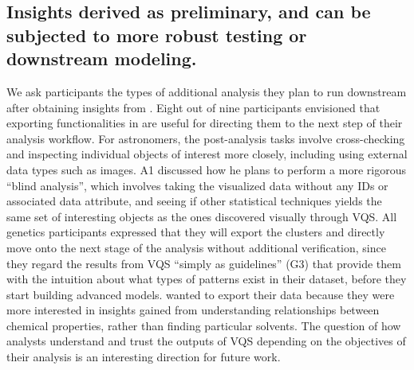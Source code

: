 \subsection{Insights derived as preliminary, and can be subjected to more robust testing or downstream modeling.}
\par We ask participants the types of additional analysis they plan to run downstream after obtaining insights from \zv. Eight out of nine participants envisioned that exporting functionalities in \zv are useful for directing them to the next step of their analysis workflow. For astronomers, the post-analysis tasks involve cross-checking and inspecting individual objects of interest more closely, including using external data types such as images. A1 discussed how he plans to perform a more rigorous ``blind analysis'', which involves taking the visualized data without any IDs or associated data attribute, and seeing if other statistical techniques yields the same set of interesting objects as the ones discovered visually through VQS. All genetics participants expressed that they will export the clusters and directly move onto the next stage of the analysis without additional verification, since they regard the results from VQS ``simply as guidelines'' (G3) that provide them with the intuition about what types of patterns exist in their dataset, before they start building advanced models.  wanted to export their data because they were more interested in insights gained from understanding relationships between chemical properties, rather than finding particular solvents. The question of how analysts understand and trust the outputs of VQS depending on the objectives of their analysis is an interesting direction for future work.